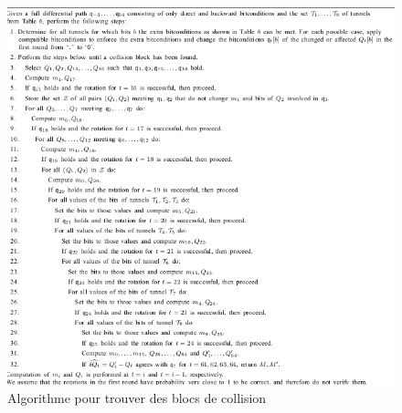 \documentclass[a4paper,11pt,french]{report}
\begin{document}
\begin{figure}[h!]
  \includegraphics[scale=.82]{./images/fcb.png}
  \caption{Algorithme pour trouver des blocs de collision}
\end{figure}
\end{document}
